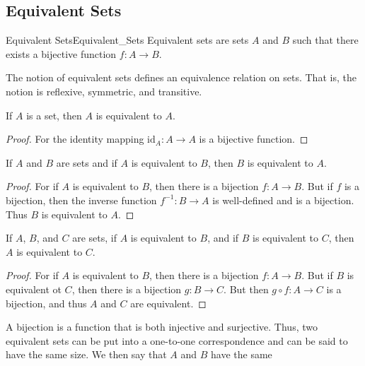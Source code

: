     \subsection{Equivalent Sets}
        \begin{fdefinition}{Equivalent Sets}{Equivalent_Sets}
            Equivalent sets are \glspl{set} $A$ and $B$ such that there exists a
            \gls{bijective function} $f:A\rightarrow{B}$.
        \end{fdefinition}
        The notion of equivalent sets defines an equivalence relation on sets.
        That is, the notion is reflexive, symmetric, and transitive.
        \begin{theorem}
            If $A$ is a set, then $A$ is equivalent to $A$.
        \end{theorem}
        \begin{proof}
            For the identity mapping $\textrm{id}_{A}:A\rightarrow{A}$ is a
            bijective function.
        \end{proof}
        \begin{theorem}
            If $A$ and $B$ are sets and if $A$ is equivalent to $B$, then $B$ is
            equivalent to $A$.
        \end{theorem}
        \begin{proof}
            For if $A$ is equivalent to $B$, then there is a bijection
            $f:A\rightarrow{B}$. But if $f$ is a bijection, then the inverse
            function $f^{-1}:B\rightarrow{A}$ is well-defined and is a
            bijection. Thus $B$ is equivalent to $A$.
        \end{proof}
        \begin{theorem}
            If $A$, $B$, and $C$ are sets, if $A$ is equivalent to $B$, and if
            $B$ is equivalent to $C$, then $A$ is equivalent to $C$.
        \end{theorem}
        \begin{proof}
            For if $A$ is equivalent to $B$, then there is a bijection
            $f:A\rightarrow{B}$. But if $B$ is equivalent ot $C$, then there is a
            bijection $g:B\rightarrow{C}$. But then $g\circ{f}:A\rightarrow{C}$ is a
            bijection, and thus $A$ and $C$ are equivalent.
        \end{proof}
        A bijection is a function that is both injective and surjective. Thus, two
        equivalent sets can be put into a one-to-one correspondence and can be said
        to have the same size. We then say that $A$ and $B$ have the same
